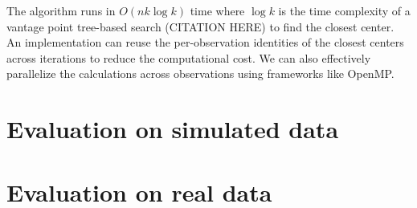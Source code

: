 \documentclass{article}
\begin{document}
The algorithm runs in $O(nk\log k)$ time where $\log k$ is the time complexity of a vantage point tree-based search (CITATION HERE) to find the closest center.
An implementation can reuse the per-observation identities of the closest centers across iterations to reduce the computational cost.
We can also effectively parallelize the calculations across observations using frameworks like OpenMP.

\section{Evaluation on simulated data}

\section{Evaluation on real data}
\end{document}
